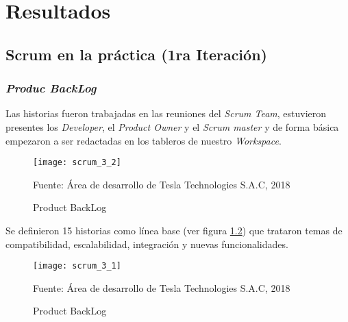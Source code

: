 \chapter{Resultados} \label{chapter:III}
\section{Scrum en la pr\'{a}ctica (1ra Iteraci\'{o}n)}
\begin{spacing}{1.5}
	\subsection{\textit{Produc BackLog}}
	Las historias fueron trabajadas en las reuniones del \textit{Scrum Team}, estuvieron presentes los \textit{Developer}, el \textit{Product Owner} y el \textit{Scrum master} y de forma b\'{a}sica empezaron a ser redactadas en los tableros de nuestro \textit{Workspace}.
	
	\begin{figure}[H]
		\centering
		\texttt{[image: scrum\_3\_2]}
		\caption {\centering \small{Product BackLog}} \label{figure:chaperIII_1}
		\small {Fuente: \'{A}rea de desarrollo de Tesla Technologies S.A.C, 2018}
	\end{figure}
	
	Se definieron 15 historias como l\'{i}nea base (ver figura \ref{figure:chaperIII_2}) que trataron temas de compatibilidad, escalabilidad, integraci\'{o}n y nuevas funcionalidades.

	\begin{figure}[H]
		\centering
		\texttt{[image: scrum\_3\_1]}
		\caption {\centering \small{Product BackLog}} \label{figure:chaperIII_2}
		\small {Fuente: \'{A}rea de desarrollo de Tesla Technologies S.A.C, 2018}
	\end{figure}


\end{spacing}
